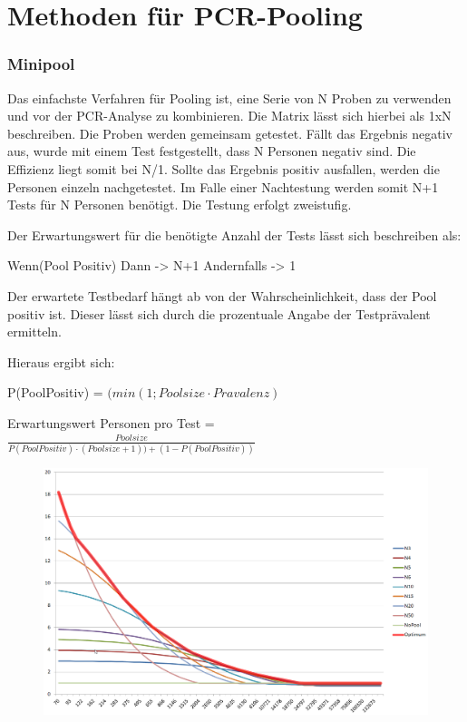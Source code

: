 \cleardoublepage
\section{Methoden für PCR-Pooling}
\subsubsection{Minipool}
Das einfachste Verfahren für Pooling ist, eine Serie von N Proben zu verwenden und vor der PCR-Analyse zu kombinieren.
Die Matrix lässt sich hierbei als 1xN beschreiben.
Die Proben werden gemeinsam getestet.
Fällt das Ergebnis negativ aus, wurde mit einem Test festgestellt, dass N Personen negativ sind.
Die Effizienz liegt somit bei N/1.
Sollte das Ergebnis positiv ausfallen, werden die Personen einzeln nachgetestet.
Im Falle einer Nachtestung werden somit N+1 Tests für N Personen benötigt.
Die Testung erfolgt zweistufig.

Der Erwartungswert für die benötigte Anzahl der Tests lässt sich beschreiben als:

Wenn(Pool Positiv)
Dann -> N+1
Andernfalls -> 1

Der erwartete Testbedarf hängt ab von der Wahrscheinlichkeit, dass der Pool positiv ist.
Dieser lässt sich durch die prozentuale Angabe der Testprävalent ermitteln.

Hieraus ergibt sich:

P(PoolPositiv) = $(min\left(1;Poolsize\cdot Pravalenz\right)$

Erwartungswert Personen pro Test =
$\frac{Poolsize}{P(PoolPositiv)\cdot (Poolsize + 1)) + (1 - P(PoolPositiv))}$

\begin{figure}[h]
	\centering
	\includegraphics[height=.6\textwidth]{img/Minipool}
\end{figure}

\cleardoublepage
